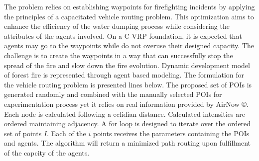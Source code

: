 \documentclass[preprint,review, 11pt,3p,authoryear]{elsarticle}
\begin{document}
The problem relies on establishing waypoints for firefighting incidents by applying the principles of a capacitated vehicle routing problem. 
This optimization aims to enhance the efficiency of the water dumping process while considering the attributes of the agents involved.
On a C-VRP foundation, it is expected that agents may go to the waypoints while do not overuse their designed capacity. 
The challenge is to create the waypoints in a way that can successfully stop the spread of the fire and slow down the fire evolution. 
Dynamic development model of forest fire is represented through agent based modeling. The formulation for the vehicle routing problem is presented lines below.
The proposed set of POIs is generated randomly and combined with the manually selected POIs for experimentation process yet it relies on real information provided by AirNow \copyright. 
Each node is calculated following a eclidian distance. Calculated intensities are ordered maintaining adjacency. A for loop is designed to iterate over the ordered set of points $I$. Each of the $i$ points receives the parameters containing the POIs and agents. 
The algorithm will return a minimized path routing upon fulfillment 
of the capcity of the agents. \\
\end{document}
